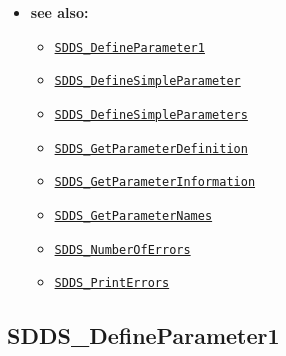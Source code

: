 \documentclass[11pt]{article}
\newcommand{\progref}[1]{\hyperref[SDDS_#1]{\tt SDDS\_#1}}
\begin{document}
\begin{itemize}
\item {\bf see also:}
\begin{itemize}
\item \progref{DefineParameter1}
\item \progref{DefineSimpleParameter}
\item \progref{DefineSimpleParameters}
\item \progref{GetParameterDefinition}
\item \progref{GetParameterInformation}
\item \progref{GetParameterNames}
\item \progref{NumberOfErrors}
\item \progref{PrintErrors}
\end{itemize}
\end{itemize}

\subsection{SDDS\_DefineParameter1}
\label{SDDS_DefineParameter1}
\end{document}
